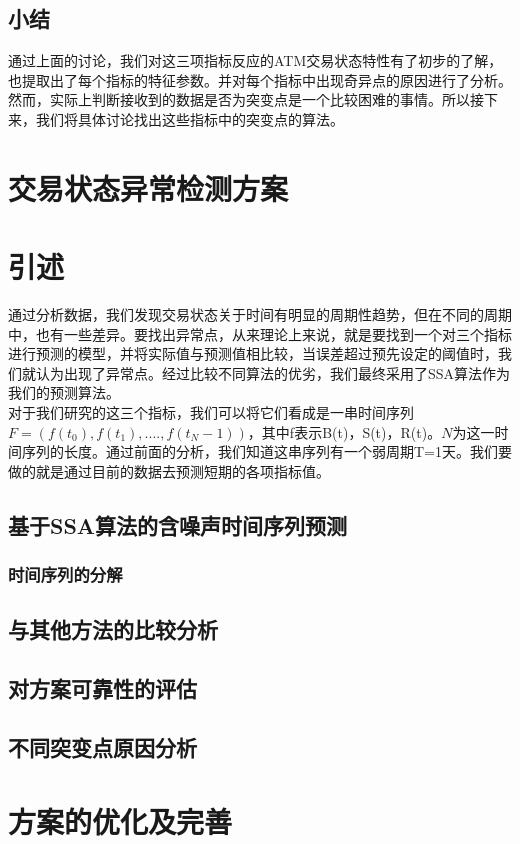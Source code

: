 \documentclass[a4paper]{article}
\begin{document}
\subsection{小结}
\indent 通过上面的讨论，我们对这三项指标反应的ATM交易状态特性有了初步的了解，也提取出了每个指标的特征参数。并对每个指标中出现奇异点的原因进行了分析。然而，实际上判断接收到的数据是否为突变点是一个比较困难的事情。所以接下来，我们将具体讨论找出这些指标中的突变点的算法。

\section{交易状态异常检测方案}
\section{引述}
\indent 通过分析数据，我们发现交易状态关于时间有明显的周期性趋势，但在不同的周期中，也有一些差异。要找出异常点，从来理论上来说，就是要找到一个对三个指标进行预测的模型，并将实际值与预测值相比较，当误差超过预先设定的阈值时，我们就认为出现了异常点。经过比较不同算法的优劣，我们最终采用了SSA算法作为我们的预测算法。  \\
\indent 对于我们研究的这三个指标，我们可以将它们看成是一串时间序列$F=(f(t_0),f(t_1),....,f(t_N-1))$，其中f表示B(t)，S(t)，R(t)。$N$为这一时间序列的长度。通过前面的分析，我们知道这串序列有一个弱周期T=1天。我们要做的就是通过目前的数据去预测短期的各项指标值。
\subsection{基于SSA算法的含噪声时间序列预测}
\subsubsection{时间序列的分解}

\subsection{与其他方法的比较分析}
\subsection{对方案可靠性的评估}
\subsection{不同突变点原因分析}

\section{方案的优化及完善}
\end{document}
